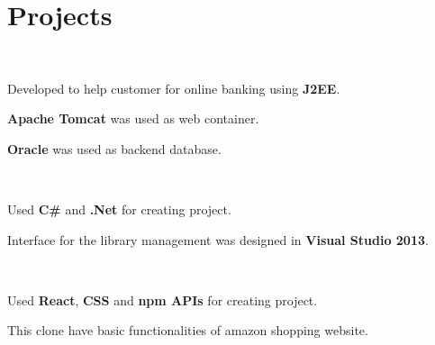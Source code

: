 \documentclass[]{deedy-resume-openfont}
\begin{document}
\hfill
\begin{minipage}[t]{0.66\textwidth} 





\section{Projects}

\\
\sectionsep
\begin{tightemize}
\item Developed to help customer for online banking using \textbf{J2EE}.
\item \textbf{Apache Tomcat} was used as web container.
\item \textbf{Oracle} was used as backend database.
\end{tightemize}
\sectionsep

\\
\begin{tightemize}
\item Used \textbf{C\#} and \textbf{.Net} for creating project.
\item Interface for the library management was designed in \textbf{Visual Studio 2013}. 
\end{tightemize}
\sectionsep

\\
\begin{tightemize}
\item Used \textbf{React}, \textbf{CSS} and \textbf{npm APIs} for creating project.
\item This clone have basic functionalities of amazon shopping website. 
\end{tightemize}
\sectionsep







\end{minipage}
\end{document}
